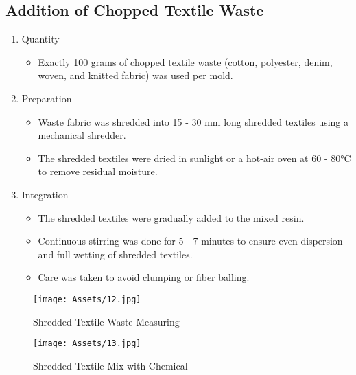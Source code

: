 \subsection{Addition of Chopped Textile Waste}
\begin{enumerate}
	\item  Quantity
	      \begin{itemize}
		      \item Exactly 100 grams of chopped textile waste (cotton, polyester, denim, woven, and knitted fabric) was used per mold.
	      \end{itemize}
	\item Preparation
	      \begin{itemize}
		      \item Waste fabric was shredded into 15 - 30 mm long shredded textiles using a mechanical shredder.
		      \item The shredded textiles were dried in sunlight or a hot-air oven at 60 - 80°C to remove residual moisture.
	      \end{itemize}
	\item  Integration
	      \begin{itemize}
		      \item The shredded textiles were gradually added to the mixed resin.
		      \item Continuous stirring was done for 5 - 7 minutes to ensure even dispersion and full wetting of shredded textiles.
		      \item Care was taken to avoid clumping or fiber balling.
	      \end{itemize}
\end{enumerate}

\begin{figure}[H]
	\centering
	\begin{minipage}{0.48\textwidth}
		\centering
		\texttt{[image: Assets/12.jpg]}
		\caption{Shredded Textile Waste Measuring}
	\end{minipage}
	\hfill
	\begin{minipage}{0.48\textwidth}
		\centering
		\texttt{[image: Assets/13.jpg]}
		\caption{Shredded Textile Mix with Chemical}
	\end{minipage}
\end{figure}

\newpage{}

